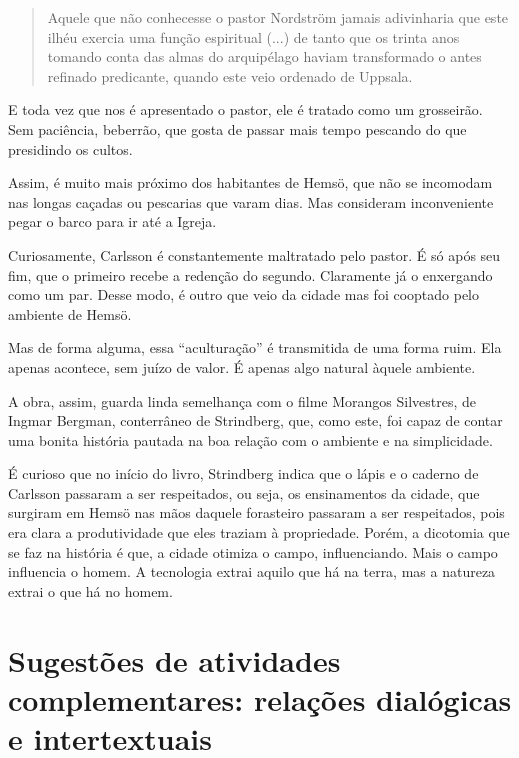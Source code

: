 \documentclass[12pt]{extarticle}
\begin{document}
\begin{quote}
Aquele que não conhecesse o pastor Nordström jamais adivinharia que este
ilhéu exercia uma função espiritual (...) de tanto que os trinta anos
tomando conta das almas do arquipélago haviam transformado o antes
refinado predicante, quando este veio ordenado de Uppsala.
\end{quote}

E toda vez que nos é apresentado o pastor, ele é tratado como um
grosseirão. Sem paciência, beberrão, que gosta de passar mais tempo
pescando do que presidindo os cultos.

Assim, é muito mais próximo dos habitantes de Hemsö, que não se
incomodam nas longas caçadas ou pescarias que varam dias. Mas consideram
inconveniente pegar o barco para ir até a Igreja.

Curiosamente, Carlsson é constantemente maltratado pelo pastor. É só
após seu fim, que o primeiro recebe a redenção do segundo. Claramente já
o enxergando como um par. Desse modo, é outro que veio da cidade mas foi
cooptado pelo ambiente de Hemsö.

Mas de forma alguma, essa ``aculturação'' é transmitida de uma forma
ruim. Ela apenas acontece, sem juízo de valor. É apenas algo natural
àquele ambiente.

A obra, assim, guarda linda semelhança com o filme Morangos Silvestres,
de Ingmar Bergman, conterrâneo de Strindberg, que, como este, foi capaz
de contar uma bonita história pautada na boa relação com o ambiente e na
simplicidade.






É curioso que no início do livro, Strindberg indica que o lápis e o
caderno de Carlsson passaram a ser respeitados, ou seja, os ensinamentos
da cidade, que surgiram em Hemsö nas mãos daquele forasteiro passaram a
ser respeitados, pois era clara a produtividade que eles traziam à
propriedade. Porém, a dicotomia que se faz na história é que, a cidade
otimiza o campo, influenciando. Mais o campo influencia o homem. A
tecnologia extrai aquilo que há na terra, mas a natureza extrai o que há
no homem.




\section{Sugestões de atividades complementares: relações dialógicas e
intertextuais}
\end{document}
